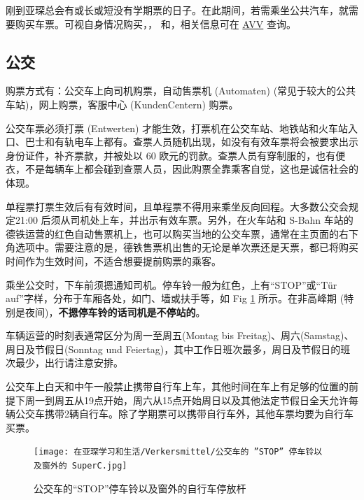     刚到亚琛总会有或长或短没有学期票的日子。在此期间，若需乘坐公共汽车，就需要购买车票。可视自身情况购买，， 和，相关信息可在 \href{http://www.avv.de/}{AVV} 查询。

  \subsection{公交}\label{subsec:公交}

    购票方式有：公交车上向司机购票，自动售票机 (Automaten) (常见于较大的公共车站)，网上购票，客服中心 (KundenCentern) 购票。

    公交车票必须打票 (Entwerten) 才能生效，打票机在公交车站、地铁站和火车站入口、巴士和有轨电车上都有。查票人员随机出现，如没有有效车票将会被要求出示身份证件，补齐票款，并被处以 60 欧元的罚款。查票人员有穿制服的，也有便衣，不是每辆车上都会碰到查票人员，因此购票全靠乘客自觉，这也是诚信社会的体现。 

    单程票打票生效后有有效时间，且单程票不得用来乘坐反向回程。大多数公交会规定21:00 后须从司机处上车，并出示有效车票。另外，在火车站和 S-Bahn 车站的德铁运营的红色自动售票机上，也可以购买当地的公交车票，通常在主页面的右下角选项中。需要注意的是，德铁售票机出售的无论是单次票还是天票，都已将购买时间作为生效时间，不适合想要提前购票的乘客。

    乘坐公交时，下车前须摁通知司机。停车铃一般为红色，上有``STOP''或``Tür auf''字样，分布于车厢各处，如门、墙或扶手等，如 Fig \ref{fig:公交车的``STOP''停车铃以及窗外的自行车停放杆} 所示。在非高峰期 (特别是夜间)，\textbf{不摁停车铃的话司机是不停站的}。

    车辆运营的时刻表通常区分为周一至周五(Montag bis Freitag)、周六(Samstag)、周日及节假日(Sonntag und Feiertag)，其中工作日班次最多，周日及节假日的班次最少，出行请注意安排。

    公交车上白天和中午一般禁止携带自行车上车，其他时间在车上有足够的位置的前提下周一到周五从19点开始，周六从15点开始周日以及其他法定节假日全天允许每辆公交车携带2辆自行车。除了学期票可以携带自行车外，其他车票均要为自行车买票。

    \begin{figure}[ht]
      \centering
      \texttt{[image: 在亚琛学习和生活/Verkersmittel/公交车的 ”STOP” 停车铃以及窗外的 SuperC.jpg]}
      \caption{公交车的``STOP''停车铃以及窗外的自行车停放杆}
      \label{fig:公交车的``STOP''停车铃以及窗外的自行车停放杆}
    \end{figure}

